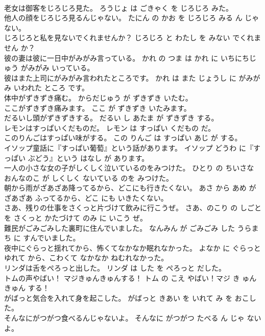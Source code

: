 \documentclass[8pt]{extreport}
\begin{document}
\begin{CJK}{UTF8}{min}
\\	老女は御客をじろじろ見た。	ろうじょ は ごきゃく を じろじろ みた。	
\\	他人の顔をじろじろ見るんじゃない。	たにん の かお を じろじろ みる ん じゃ ない。	
\\	じろじろと私を見ないでくれませんか？	じろじろ と わたし を みない でくれません か？	
\\	彼の妻は彼に一日中がみがみ言っている。	かれ の つま は かれ に いちにちじゅう がみがみ いっている。	
\\	彼はまた上司にがみがみ言われたところです。	かれ は また じょうし に がみがみ いわれた ところ です。	
\\	体中がずきずき痛む。	からだじゅう が ずきずき いたむ。	
\\	ここがずきずき痛みます。	ここ が ずきずき いたみます。	
\\	だるいし頭がずきずきする。	だるい し あたま が ずきずき する。	
\\	レモンはすっぱいくだものだ。	レモン は すっぱい くだもの だ。	
\\	このりんごはすっぱい味がする。	この りんご は すっぱい あじ が する。	
\\	イソップ童話に『すっぱい葡萄』という話があります。	イソップ どうわ に『すっぱい ぶどう』という はなし が あります。	
\\	一人の小さな女の子がしくしく泣いているのをみつけた。	ひとり の ちいさな おんなのこ が しくしく ないている のを みつけた。	
\\	朝から雨がざあざあ降ってるから、どこにも行きたくない。	あさ から あめ が ざあざあ ふってるから、どこ にも いきたくない。	
\\	さあ、残りの仕事をさくっと片づけて飲みに行こうぜ。	さあ、のこり の しごと を さくっと かたづけて のみ に いこう ぜ。	
\\	難民がごみごみした裏町に住んでいました。	なんみん が ごみごみ した うらまち に すんでいました。	
\\	夜中にぐらっと揺れてから、怖くてなかなか眠れなかった。	よなか に ぐらっと ゆれて から、こわくて なかなか ねむれなかった。	
\\	リンダは舌をぺろっと出した。	リンダ は した を ぺろっと だした。	
\\	トムの声やばい！ マジきゅんきゅんする！	トム の こえ やばい！マジ き ゅんきゅん する！	
\\	がばっと気合を入れて身を起こした。	がばっと きあい を いれて み を おこした。	
\\	そんなにがつがつ食べるんじゃないよ。	そんなに がつがつ たべる ん じゃ ない よ。	

\end{CJK}
\end{document}
